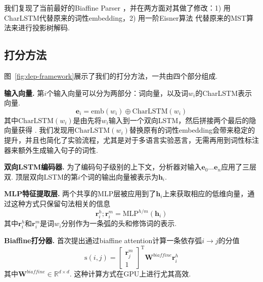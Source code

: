 我们复现了当前最好的Biaffine Parser \citep{dozat-etal-2017-biaffine}，并在两方面对其做了修改：1) 用CharLSTM代替原来的词性embedding，2) 用一阶Eisner算法 \citep{eisner-2000-iwptbook}代替原来的MST算法来进行投影树解码.

\subsection{打分方法}
图~\ref{fig:dep-framework}展示了我们的打分方法，一共由四个部分组成.

\noindent\textbf{输入向量.}
第$i$个输入向量可以分为两部分：词向量，以及词$w_i$的CharLSTM表示向量.
\begin{equation}
  \label{eq:input}
  \mathbf{e}_i=\mathrm{emb}({w_i}) \oplus \mathrm{CharLSTM}(w_i)
\end{equation}
其中$\mathrm{CharLSTM}(w_i)$是由先将$w_i$输入到一个双向LSTM，然后拼接两个最后的隐向量获得 \citep{lample-etal-2016-neural}.
我们发现用$\mathrm{CharLSTM}(w_i)$替换原有的词性embedding会带来稳定的提升，并且也简化了实验流程，尤其是对于多语言实验恶言，无需再用到词性标注器来额外生成输入句子的词性.

\noindent\textbf{双向LSTM编码器.}
为了编码句子级别的上下文，分析器对输入$\mathbf{e}_0 \dots \mathbf{e}_n$应用了三层双.
顶层双向LSTM的第$i$个词的输出向量被表示为$\mathbf{h}_i$.

\noindent\textbf{MLP特征提取层.}
两个共享的MLP层被应用到了$\mathbf{h}_i$上来获取相应的低维向量，通过这种方式只保留句法相关的信息
\begin{equation}
  \label{mlp-arc}
  \mathbf{r}_i^{h}; \mathbf{r}_i^{m} =\mathrm{MLP}^{h/m} \left( \mathbf{h}_i \right)
\end{equation}
其中$\mathbf{r}_i^{h}$和$\mathbf{r}_i^{m}$是词$w_i$分别作为一条弧的头和修饰词的表示.

\noindent\textbf{Biaffine打分器.}
\citet{dozat-etal-2017-biaffine}首次提出通过biaffine attention计算一条依存弧$i \rightarrow j$的分值
\begin{equation} \label{eq:biaffine}
  \mathrm{s}(i,j) =  \left[
    \begin{array}{c}
      \mathbf{r}_{j}^{m} \\
      1
    \end{array}
    \right]^\mathrm{T}
  \mathbf{W}^\textit{biaffine}  \mathbf{r}_{i}^{h}
\end{equation}
其中$\mathbf{W}^\textit{biaffine} \in \mathbb{R}^{d \times d}$.
这种计算方式在GPU上进行尤其高效.

